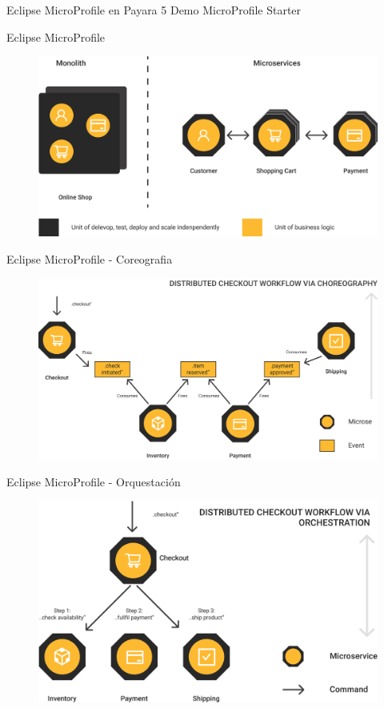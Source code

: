 \documentclass[aspectratio=169]{beamer}
\begin{document}
\begin{frame}[fragile]{Eclipse MicroProfile en Payara 5}
\LARGE Demo MicroProfile Starter
\end{frame}

\begin{frame}{Eclipse MicroProfile}
\begin{figure}
	\centering
	\includegraphics[width=0.8\linewidth]{Images/mp0}
\end{figure}
\end{frame}

\begin{frame}{Eclipse MicroProfile - Coreografia}
\begin{figure}
	\centering
	\includegraphics[width=0.8\linewidth]{Images/mpcore}
\end{figure}
\end{frame}

\begin{frame}{Eclipse MicroProfile - Orquestación}
\begin{figure}
	\centering
	\includegraphics[width=0.8\linewidth]{Images/mporch}
\end{figure}
\end{frame}
\end{document}
